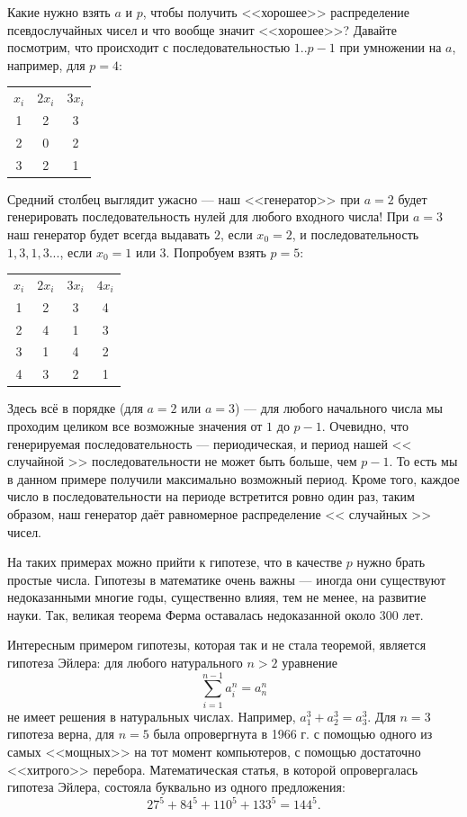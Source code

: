\documentclass{book}
\begin{document}
Какие нужно взять $a$ и $p$, чтобы получить <<хорошее>> распределение псевдослучайных чисел и что
вообще значит <<хорошее>>? Давайте посмотрим, что происходит с последовательностью $1..p-1$ при
умножении на $a$, например, для $p = 4$:
\begin{table}[h]
    \centering
    \begin{tabular}{ c | c | c }
        $x_i$ & $2 x_i$ & $3 x_i$ \\
        1 & 2 & 3 \\
        2 & 0 & 2 \\
        3 & 2 & 1 \\
    \end{tabular}
\end{table}
Средний столбец выглядит ужасно --- наш <<генератор>> при $a = 2$ будет генерировать
последовательность нулей для любого входного числа! При $a = 3$ наш генератор будет всегда выдавать
$2$, если $x_0 = 2$, и последовательность $1,3,1,3...$, если $x_0 = 1$ или $3$.  Попробуем взять $p
= 5$:
\begin{table}[h]
    \centering
    \begin{tabular}{ c | c | c | c }
        $x_i$ & $2 x_i$ & $3 x_i$ & $4 x_i$ \\
        1 & 2 & 3 & 4 \\
        2 & 4 & 1 & 3 \\
        3 & 1 & 4 & 2 \\
        4 & 3 & 2 & 1 \\
    \end{tabular}
\end{table}
Здесь всё в порядке (для $a = 2$ или $a = 3$) --- для любого начального числа мы проходим целиком все возможные значения от
$1$ до $p - 1$. Очевидно, что генерируемая последовательность --- периодическая, и период нашей << случайной >> последовательности не может быть
больше, чем $p-1$. То есть мы в данном примере получили максимально возможный период. Кроме того,
каждое число в последовательности на периоде встретится ровно один раз, таким образом, наш
генератор даёт равномерное распределение << случайных >> чисел.

На таких примерах можно прийти к гипотезе, что в качестве $p$ нужно брать
простые числа. Гипотезы в математике очень важны --- иногда они существуют недоказанными многие
годы, существенно влияя, тем не менее, на развитие науки. Так, великая теорема Ферма оставалась
недоказанной около 300 лет.

Интересным примером гипотезы, которая так и не стала теоремой, является гипотеза Эйлера: для любого
натурального $n > 2$ уравнение
\begin{equation}
    \sum_{i = 1}^{n - 1} a_i^n = a_n^n
\end{equation}
не имеет решения в натуральных числах. Например, $a_1^3 + a_2^3 = a_3^3$. Для $n = 3$ гипотеза
верна, для $n = 5$ была опровергнута в 1966 г. с помощью одного из самых <<мощных>> на тот момент
компьютеров, с помощью достаточно <<хитрого>> перебора. Математическая статья, в которой
опровергалась гипотеза Эйлера, состояла буквально из одного предложения:
\begin{equation}
    27^5 + 84^5 + 110^5 + 133^5 = 144^5.
\end{equation}
\end{document}
